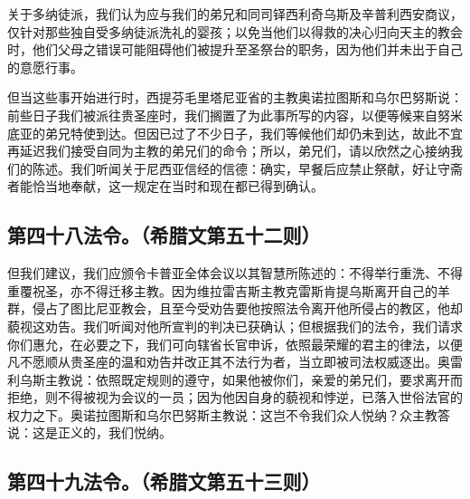 \par

关于多纳徒派，我们认为应与我们的弟兄和同司铎西利奇乌斯及辛普利西安商议，仅针对那些独自受多纳徒派洗礼的婴孩；以免当他们以得救的决心归向天主的教会时，他们父母之错误可能阻碍他们被提升至圣祭台的职务，因为他们并未出于自己的意愿行事。\par

但当这些事开始进行时，西提芬毛里塔尼亚省的主教奥诺拉图斯和乌尔巴努斯说：前些日子我们被派往贵圣座时，我们搁置了为此事所写的内容，以便等候来自努米底亚的弟兄特使到达。但因已过了不少日子，我们等候他们却仍未到达，故此不宜再延迟我们接受自同为主教的弟兄们的命令；所以，弟兄们，请以欣然之心接纳我们的陈述。我们听闻关于尼西亚信经的信德：确实，早餐后应禁止祭献，好让守斋者能恰当地奉献，这一规定在当时和现在都已得到确认。\par


\subsection{第四十八法令。（希腊文第五十二则）}

\par

但我们建议，我们应颁令卡普亚全体会议以其智慧所陈述的：不得举行重洗、不得重覆祝圣，亦不得迁移主教。因为维拉雷吉斯主教克雷斯肯提乌斯离开自己的羊群，侵占了图比尼亚教会，且至今受劝告要他按照法令离开他所侵占的教区，他却藐视这劝告。我们听闻对他所宣判的判决已获确认；但根据我们的法令，我们请求你们惠允，在必要之下，我们可向辖省长官申诉，依照最荣耀的君主的律法，以便凡不愿顺从贵圣座的温和劝告并改正其不法行为者，当立即被司法权威逐出。奥雷利乌斯主教说：依照既定规则的遵守，如果他被你们，亲爱的弟兄们，要求离开而拒绝，则不得被视为会议的一员；因为他因自身的藐视和悖逆，已落入世俗法官的权力之下。奥诺拉图斯和乌尔巴努斯主教说：这岂不令我们众人悦纳？众主教答说：这是正义的，我们悦纳。\par


\subsection{第四十九法令。（希腊文第五十三则）}

\par

